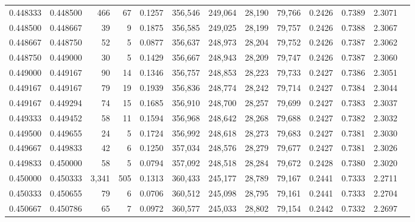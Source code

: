 \begin{tabular}{rrrrrrrrrrrrr}
0.448333 & 0.448500 &   466 &  67 &                                     0.1257 & 356,546 & 249,064 &  28,190 &  79,766 & 0.2426 & 0.7389 & 2.3071 \\
0.448500 & 0.448667 &    39 &   9 &                                     0.1875 & 356,585 & 249,025 &  28,199 &  79,757 & 0.2426 & 0.7388 & 2.3067 \\
0.448667 & 0.448750 &    52 &   5 &                                     0.0877 & 356,637 & 248,973 &  28,204 &  79,752 & 0.2426 & 0.7387 & 2.3062 \\
0.448750 & 0.449000 &    30 &   5 &                                     0.1429 & 356,667 & 248,943 &  28,209 &  79,747 & 0.2426 & 0.7387 & 2.3060 \\
0.449000 & 0.449167 &    90 &  14 &                                     0.1346 & 356,757 & 248,853 &  28,223 &  79,733 & 0.2427 & 0.7386 & 2.3051 \\
0.449167 & 0.449167 &    79 &  19 &                                     0.1939 & 356,836 & 248,774 &  28,242 &  79,714 & 0.2427 & 0.7384 & 2.3044 \\
0.449167 & 0.449294 &    74 &  15 &                                     0.1685 & 356,910 & 248,700 &  28,257 &  79,699 & 0.2427 & 0.7383 & 2.3037 \\
0.449333 & 0.449452 &    58 &  11 &                                     0.1594 & 356,968 & 248,642 &  28,268 &  79,688 & 0.2427 & 0.7382 & 2.3032 \\
0.449500 & 0.449655 &    24 &   5 &                                     0.1724 & 356,992 & 248,618 &  28,273 &  79,683 & 0.2427 & 0.7381 & 2.3030 \\
0.449667 & 0.449833 &    42 &   6 &                                     0.1250 & 357,034 & 248,576 &  28,279 &  79,677 & 0.2427 & 0.7381 & 2.3026 \\
0.449833 & 0.450000 &    58 &   5 &                                     0.0794 & 357,092 & 248,518 &  28,284 &  79,672 & 0.2428 & 0.7380 & 2.3020 \\
0.450000 & 0.450333 & 3,341 & 505 &                                     0.1313 & 360,433 & 245,177 &  28,789 &  79,167 & 0.2441 & 0.7333 & 2.2711 \\
0.450333 & 0.450655 &    79 &   6 &                                     0.0706 & 360,512 & 245,098 &  28,795 &  79,161 & 0.2441 & 0.7333 & 2.2704 \\
0.450667 & 0.450786 &    65 &   7 &                                     0.0972 & 360,577 & 245,033 &  28,802 &  79,154 & 0.2442 & 0.7332 & 2.2697 \\

\end{tabular}
